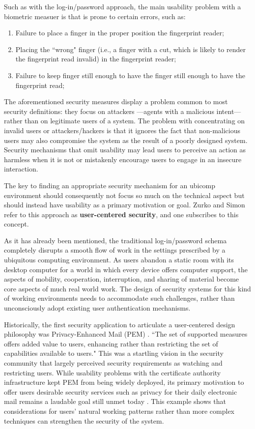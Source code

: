 \documentclass{article}
\begin{document}
Such as with the log-in/password approach, the main usability problem with a biometric measuer is that is prone to certain errors, such as:
\begin{enumerate}
\item Failure to place a finger in the proper position the fingerprint reader;
\item Placing the ``wrong" finger (i.e., a finger with a cut, which is likely to render the fingerprint read invalid) in the fingerprint reader;
\item Failure to keep finger still enough to have the finger still enough to have the fingerprint read;
\end{enumerate}

The aforementioned security measures display a problem common to most security definitions: they focus on attackers ---agents with a malicious intent--- rather than on legitimate users of a system. The problem with concentrating on invalid users or attackers/hackers is that it ignores the fact that non-malicious users may also compromise the system as the result of a poorly designed system.  Security mechanisms that omit usability may lead users to perceive an action as harmless when it is not or mistakenly encourage users to engage in an insecure interaction. 

The key to finding an appropriate security mechanism for an ubicomp environment should consequently not focus so much on the technical aspect but should instead have usability as a primary motivation or goal.  Zurko and Simon \cite{zurko1996user} refer to this approach as \textbf{user-centered security}, and one subscribes to this concept. 

As it has already been mentioned, the traditional log-in/password schema completely disrupts a smooth flow of work in the settings prescribed by a ubiquitous computing environment. As users abandon a static room with its desktop computer for a world in which every device offers computer support, the aspects of mobility, cooperation, interruption, and sharing of material become core aspects of much real world work. The design of security systems for this kind of working environments needs to accommodate such challenges, rather than unconsciously adopt existing user authentication mechanisms.

Historically, the first security application to articulate a user-centered design philosophy was Privacy-Enhanced Mail (PEM) \cite{linn1993privacy}. ``The set of supported measures offers added value to users, enhancing rather than restricting the set of capabilities available to users." This was a startling vision in the security community that largely perceived security requirements as watching and restricting users. While usability problems with the certificate authority infrastructure kept PEM from being widely deployed, its primary motivation to offer users desirable security services such as privacy for their daily electronic mail remains a laudable goal still  unmet today \cite{zurko1996user}.  This example shows that considerations for users' natural working patterns rather than more complex techniques can strengthen the security of the system.
\end{document}
